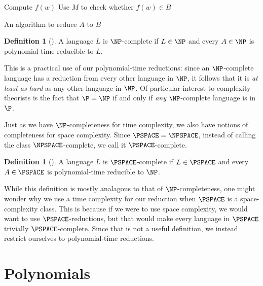 \documentclass{reedthesis}
\theoremstyle{plain}
\theoremstyle{definition}
\newtheorem{defn}[thm]{Definition}
\theoremstyle{remark}
\numberwithin{equation}{section}
\begin{document}
\begin{algorithm}[H]
  Compute $f(w)$\;
  Use $M$ to check whether $f(w) \in B$\;
  \;
  \caption{An algorithm to reduce $A$ to $B$}
\end{algorithm}

\begin{defn}[{\cite[Def.\ 7.34]{Sip97}}]\label{def:np-complete}
  A language $L$ is $\NP$-complete if $L \in \NP$ and every $A \in \NP$ is
  polynomial-time reducible to $L$.
\end{defn}

This is a practical use of our polynomial-time reductions: since an
$\NP$-complete language has a reduction from every other language in $\NP$, it
follows that it is \emph{at least as hard} as any other language in $\NP$. Of
particular interest to complexity theorists is the fact that $\P = \NP$ if and
only if \emph{any} $\NP$-complete language is in $\P$.

Just as we have $\NP$-completeness for time complexity, we also have notions of
completeness for space complexity. Since $\PSPACE = \NPSPACE$, instead of
calling the class $\NPSPACE$-complete, we call it $\PSPACE$-complete.

\begin{defn}[{\cite[Def.\ 8.8]{Sip97}}]\label{def:pspace-complete}
  A language $L$ is $\PSPACE$-complete if $L \in \PSPACE$ and every $A \in \PSPACE$
  is polynomial-time reducible to $\NP$.
\end{defn}

While this definition is mostly analagous to that of $\NP$-completeness, one
might wonder why we use a time complexity for our reduction when $\PSPACE$ is a
space-complexity class. This is because if we were to use space complexity, we
would want to use $\PSPACE$-reductions, but that would make every language in
$\PSPACE$ trivially $\PSPACE$-complete. Since that is not a useful definition,
we instead restrict ourselves to polynomial-time reductions.


\section{Polynomials}
\end{document}
